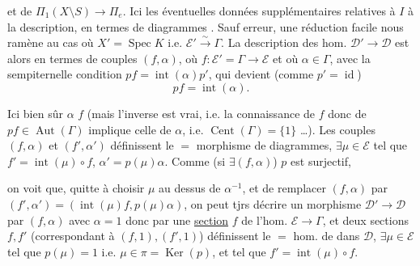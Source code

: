 
et de $\Pi_1(X\setminus S)\to\Pi_e$. 
Ici les éventuelles données supplémentaires relatives à $I$  à la description, en termes de diagrammes  .
Sauf erreur, une réduction facile nous ramène au cas où $X'=\operatorname{Spec}K$ i.e. $\mathcal E'\xrightarrow{\sim}\Gamma$. La description des hom. $\mathcal D'\to\mathcal D$ est alors  en termes de couples $(f,\alpha)$, où $f:\mathcal E'=\Gamma\to\mathcal E$ et où $\alpha\in\Gamma$, avec la sempiternelle condition $pf=\operatorname{int}(\alpha)p'$, qui devient (comme $p'=\operatorname{id}$)
\[
 pf=\operatorname{int}(\alpha).
\]

Ici bien sûr $\alpha$  $f$ (mais l'inverse est   vrai, i.e. la connaissance de $f$ donc de $pf\in\operatorname{Aut}(\Gamma)$ implique celle de $\alpha$, i.e. $\operatorname{Cent}(\Gamma)=\{1\}$ \ldots).
Les couples $(f,\alpha)$ et $(f',\alpha')$ définissent le $=$ morphisme de diagrammes,  $\exists\mu\in\mathcal E$ tel que $f'=\operatorname{int}(\mu)\circ f$, $\alpha'=p(\mu)\alpha$.
Comme (si $\exists(f,\alpha)$) $p$ est surjectif,


on voit que, quitte à choisir $\mu$ au dessus de  $\alpha^{-1}$, et de remplacer $(f,\alpha)$ par $(f',\alpha')=(\operatorname{int}(\mu)f,p(\mu)\alpha)$, on peut tjrs décrire un morphisme $\mathcal D'\to\mathcal D$ par $(f,\alpha)$ avec $\alpha=1$ donc par une \uline{section} $f$ de l'hom. $\mathcal E\to\Gamma$, et deux sections $f,f'$ (correspondant à $(f,1),(f',1)$) définissent le $=$ hom. de  dans $\mathcal D$,  $\exists\mu\in\mathcal E$ tel que $p(\mu)=1$ i.e. $\mu\in\pi=\operatorname{Ker}(p)$, et tel que $f'=\operatorname{int}(\mu)\circ f$.

